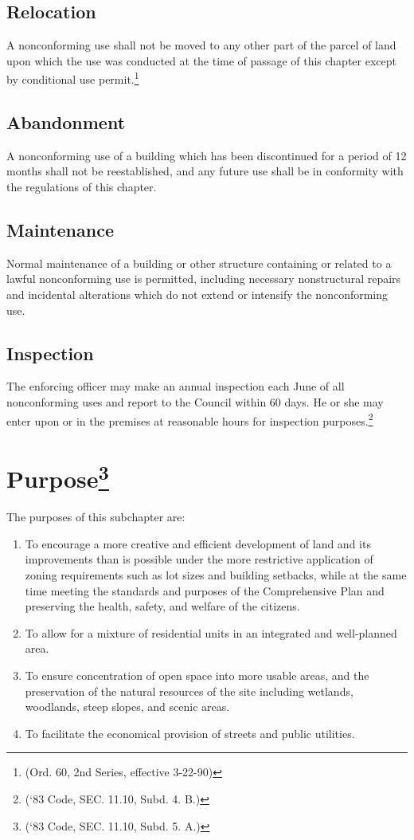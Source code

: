 \subsection{Relocation}
A nonconforming use shall not be moved to any other part of the parcel of land upon which the use was conducted at the time of passage of this chapter except by conditional use permit.\footnote{(Ord. 60, 2nd Series, effective 3-22-90)}
\subsection{Abandonment}
A nonconforming use of a building which has been discontinued for a period of 12 months shall not be reestablished, and any future use shall be in conformity with the regulations of this chapter.
\subsection{Maintenance}
Normal maintenance of a building or other structure containing or related to a lawful nonconforming use is permitted, including necessary nonstructural repairs and incidental alterations which do not extend or intensify the nonconforming use.
\subsection{Inspection}
The enforcing officer may make an annual inspection each June of all nonconforming uses and report to the Council within 60 days.  He or she may enter upon or in the premises at reasonable hours for inspection purposes.\footnote{(‘83 Code, SEC. 11.10, Subd. 4. B.)}


\setcounter{section}{129}
\section{Purpose\footnote{(‘83 Code, SEC. 11.10, Subd. 5. A.)}}
The purposes of this subchapter are:
\begin{enumerate}[{\indent}A)]
    \item To encourage a more creative and efficient development of land and its improvements than is possible under the more restrictive application of zoning requirements such as lot sizes and building setbacks, while at the same time meeting the standards and purposes of the Comprehensive Plan and preserving the health, safety, and welfare of the citizens.
    \item To allow for a mixture of residential units in an integrated and well-planned area.
    \item To ensure concentration of open space into more usable areas, and the preservation of the natural resources of the site including wetlands, woodlands, steep slopes, and scenic areas.
    \item To facilitate the economical provision of streets and public utilities.
\end{enumerate}


